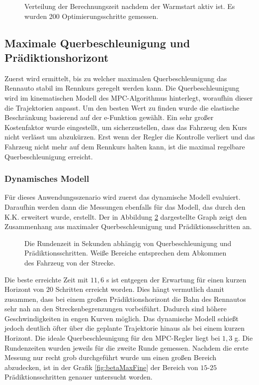 \documentclass{like}
\begin{document}
\begin{figure}[ht!]
	\centering
	 
	\caption{Verteilung der Berechnungszeit nachdem der Warmstart aktiv ist. Es wurden 200 Optimierungsschritte gemessen.}
	\label{fig:computeCostSoftConstDynamicHist}
\end{figure}

\subsection{Maximale Querbeschleunigung und Prädiktionshorizont}
Zuerst wird ermittelt, bis zu welcher maximalen Querbeschleunigung  das Rennauto stabil im Rennkurs geregelt werden kann. Die Querbeschleunigung wird im kinematischen Modell des \ac{MPC}-Algorithmus hinterlegt, woraufhin dieser die Trajektorien anpasst. Um den besten Wert zu finden wurde die elastische Beschränkung basierend auf der e-Funktion gewählt. Ein sehr großer Kostenfaktor wurde eingestellt, um sicherzustellen, dass das Fahrzeug den Kurs nicht verlässt um abzukürzen. Erst wenn der Regler die Kontrolle verliert und das Fahrzeug nicht mehr auf dem Rennkurs halten kann, ist die maximal regelbare Querbeschleunigung erreicht.

\subsubsection{Dynamisches Modell}
Für dieses Anwendungsszenario wird zuerst das dynamische Modell evaluiert. Daraufhin werden dann die Messungen ebenfalls für das Modell, das durch den \ac{K.K.} erweitert wurde, erstellt.
Der in Abbildung \ref{fig:betaMaxN} dargestellte Graph zeigt den Zusammenhang aus maximaler Querbeschleunigung und Prädiktionsschritten an. 
\begin{figure}[ht!]
	\centering
	 
	\caption{Die Rundenzeit in Sekunden abhängig von Querbeschleunigung und Prädiktionsschritten. Weiße Bereiche entsprechen dem Abkommen des Fahrzeug von der Strecke.}
	\label{fig:betaMaxN}
\end{figure}

Die beste erreichte Zeit mit $11,6$ s ist entgegen der Erwartung für einen kurzen Horizont von $20$ Schritten erreicht worden. Dies hängt vermutlich damit zusammen, dass bei einem großen Prädiktionshorizont die Bahn des Rennautos sehr nah an den Streckenbegrenzungen vorbeiführt. Dadurch sind höhere Geschwindigkeiten in engen Kurven möglich. Das dynamische Modell schießt jedoch deutlich öfter über die geplante Trajektorie hinaus als bei einem kurzen Horizont. Die ideale Querbeschleunigung für den \ac{MPC}-Regler liegt bei $1,3$ g. Die Rundenzeiten wurden jeweils für die zweite Runde gemessen. Nachdem die erste Messung nur recht grob durchgeführt wurde um einen großen Bereich abzudecken, ist in der Grafik \ref{fig:betaMaxFine} der Bereich von $15$-$25$ Prädiktionsschritten genauer untersucht worden.
\end{document}

